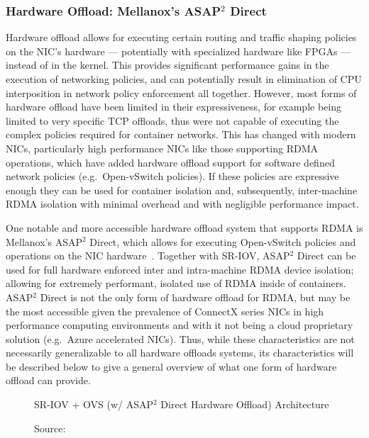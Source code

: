 \documentclass[12pt,titlepage]{article}
\begin{document}
\subsubsection{Hardware Offload: Mellanox's ASAP$^2$ Direct}
Hardware offload allows for executing certain routing and traffic shaping policies on the NIC's hardware --- potentially with specialized hardware like FPGAs --- instead of in the kernel.
This provides significant performance gains in the execution of networking policies, and can potentially result in elimination of CPU interposition in network policy enforcement all together.
However, most forms of hardware offload have been limited in their expressiveness, for example being limited to very specific TCP offloads, thus were not capable of executing the complex policies required for container networks.
This has changed with modern NICs, particularly high performance NICs like those supporting RDMA operations, which have added hardware offload support for software defined network policies (e.g.\ Open-vSwitch policies).
If these policies are expressive enough they can be used for container isolation and, subsequently, inter-machine RDMA isolation with minimal overhead and with negligible performance impact.

One notable and more accessible hardware offload system that supports RDMA is Mellanox's ASAP$^2$ Direct, which allows for executing Open-vSwitch policies and operations on the NIC hardware~\cite{mellanoxdockerovs}.
Together with SR-IOV, ASAP$^2$ Direct can be used for full hardware enforced inter and intra-machine RDMA device isolation;
allowing for extremely performant, isolated use of RDMA inside of containers.
ASAP$^2$ Direct is not the only form of hardware offload for RDMA, but may be the most accessible given the prevalence of ConnectX series NICs in high performance computing environments and with it not being a cloud proprietary solution (e.g.\ Azure accelerated NICs).
Thus, while these characteristics are not necessarily generalizable to all hardware offloads systems, its characteristics will be described below to give a general overview of what one form of hardware offload can provide.

\begin{figure}
	\centering
	\caption{SR-IOV + OVS (w/ ASAP$^2$ Direct Hardware Offload) Architecture}
	\caption*{Source:~\cite{mellanoxdockerovs}}
\end{figure}
\end{document}
